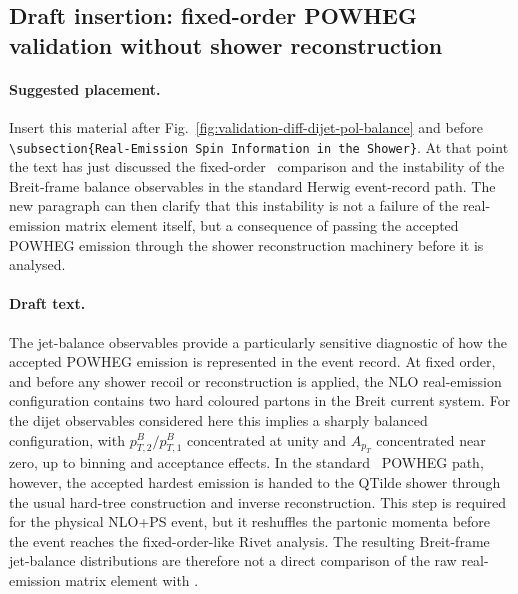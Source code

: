 
\subsection*{Draft insertion: fixed-order POWHEG validation without shower reconstruction}

\paragraph{Suggested placement.}
Insert this material after
Fig.~\ref{fig:validation-diff-dijet-pol-balance} and before
\texttt{\textbackslash subsection\{Real-Emission Spin Information in the Shower\}}.
At that point the text has just discussed the fixed-order \POLDIS\ comparison
and the instability of the Breit-frame balance observables in the standard
Herwig event-record path. The new paragraph can then clarify that this
instability is not a failure of the real-emission matrix element itself, but a
consequence of passing the accepted POWHEG emission through the shower
reconstruction machinery before it is analysed.

\paragraph{Draft text.}
The jet-balance observables provide a particularly sensitive diagnostic of how
the accepted POWHEG emission is represented in the event record. At fixed order,
and before any shower recoil or reconstruction is applied, the NLO real-emission
configuration contains two hard coloured partons in the Breit current system.
For the dijet observables considered here this implies a sharply balanced
configuration, with $p_{T,2}^{B}/p_{T,1}^{B}$ concentrated at unity and
$A_{p_T}$ concentrated near zero, up to binning and acceptance effects. In the
standard \Herwig\ POWHEG path, however, the accepted hardest emission is handed
to the QTilde shower through the usual hard-tree construction and inverse
reconstruction. This step is required for the physical NLO+PS event, but it
reshuffles the partonic momenta before the event reaches the fixed-order-like
Rivet analysis. The resulting Breit-frame jet-balance distributions are
therefore not a direct comparison of the raw real-emission matrix element with
\POLDIS.

